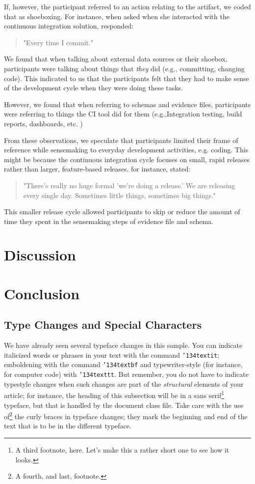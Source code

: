 \documentclass{sig-alternate}
\begin{document}
If, however, the participant referred to an action relating to the artifact, we coded that as shoeboxing. For instance, when asked when she interacted with the continuous integration solution, \srutitwo responded: 

\begin{quote}
"Every time I commit."	
\end{quote}


We found that when talking about external data sources  or their shoebox, participants were talking about things that \textit{they} did (e.g., committing, changing code). This indicated to us that the participants felt that they had to make sense of the development cycle when they were doing these tasks. 

However, we found that when referring to schemas and evidence files, participants were referring to things the CI tool did for them (e.g.,Integration testing, build reports, dashboards, etc.
) 

From these observations, we speculate that participants limited their frame of reference while sensemaking to everyday development activities, e.g. coding. This might be because the continuous integration cycle focuses on small, rapid releases rather than larger, feature-based releases. for instance, \cpg stated:

\begin{quote}
"There's really no huge formal 'we're doing a release.' We are releasing every single day. Sometimes little things, sometimes big things."	
\end{quote}


This smaller release cycle allowed participants to skip or reduce the amount of time they spent in the sensemaking steps of evidence file and schema. 

\section{Discussion}
\section{Conclusion}

\subsection{Type Changes and {\subsecit Special} Characters}
We have already seen several typeface changes in this sample.  You
can indicate italicized words or phrases in your text with
the command \texttt{{\char'134}textit}; emboldening with the
command \texttt{{\char'134}textbf}
and typewriter-style (for instance, for computer code) with
\texttt{{\char'134}texttt}.  But remember, you do not
have to indicate typestyle changes when such changes are
part of the \textit{structural} elements of your
article; for instance, the heading of this subsection will
be in a sans serif\footnote{A third footnote, here.
Let's make this a rather short one to
see how it looks.} typeface, but that is handled by the
document class file. Take care with the use
of\footnote{A fourth, and last, footnote.}
the curly braces in typeface changes; they mark
the beginning and end of
the text that is to be in the different typeface.
\end{document}
